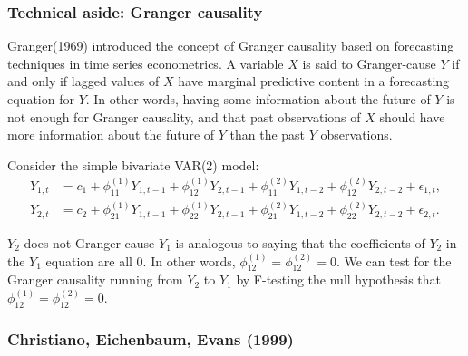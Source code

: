 \subsubsection{Technical aside: Granger causality}

Granger(1969\cite{granger1969investigating}) introduced the concept of Granger causality based on forecasting techniques 
in time series econometrics. A variable $X$ is said to Granger-cause $Y$ if and only if 
lagged values of $X$ have marginal predictive content in a forecasting equation for $Y$.
In other words, having some information about the future of $Y$ is not enough for Granger causality, 
and that past observations of $X$ should have more information about
the future of $Y$ than the past $Y$ observations.

Consider the simple bivariate VAR(2) model:
\begin{align*}
    Y_{1,t} &= c_1 + \phi_{11}^{(1)} Y_{1,t-1} + \phi_{12}^{(1)} Y_{2,t-1} + \phi_{11}^{(2)} Y_{1,t-2} + \phi_{12}^{(2)} Y_{2,t-2} + \epsilon_{1,t}, \\
    Y_{2,t} &= c_2 + \phi_{21}^{(1)} Y_{1,t-1} + \phi_{22}^{(1)} Y_{2,t-1} + \phi_{21}^{(2)} Y_{1,t-2} + \phi_{22}^{(2)} Y_{2,t-2} + \epsilon_{2,t}.
\end{align*}

$Y_2$ does not Granger-cause $Y_1$ is analogous to saying that the coefficients of $Y_2$ in the $Y_1$ equation are all 0. 
In other words, $\phi_{12}^{(1)} = \phi_{12}^{(2)} = 0$. We can test for the Granger causality running from $Y_2$ to $Y_1$ by 
F-testing the null hypothesis that $\phi_{12}^{(1)} = \phi_{12}^{(2)} = 0$.

\subsubsection{Christiano, Eichenbaum, Evans (1999)}

